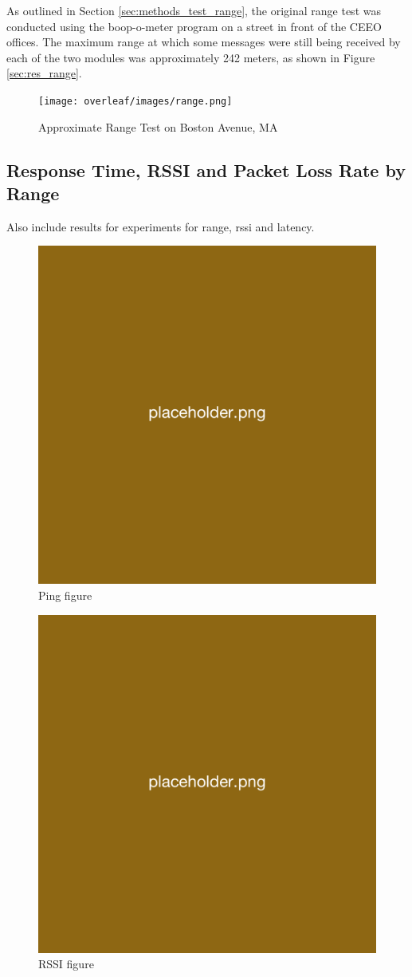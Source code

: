 As outlined in Section \ref{sec:methods_test_range}, the original range test was conducted using the boop-o-meter program on a street in front of the CEEO offices. The maximum range at which some messages were still being received by each of the two modules was approximately 242 meters, as shown in Figure \ref{sec:res_range}.

\begin{figure}[H]
    \centering
    \texttt{[image: overleaf/images/range.png]}
    \vspace{\ftspace}
    \caption{Approximate Range Test on Boston Avenue, MA}
    \label{fig:range}
\end{figure}


\subsection{\label{sec:res_rssi}Response Time, RSSI and Packet Loss Rate by Range}

Also include results for experiments for range, rssi and latency.

\begin{figure}[H]
    \centering
    \includegraphics[width=.5\linewidth]{overleaf/images/placeholder.png}
    \vspace{\ftspace}
    \caption{Ping figure}
    \label{fig:ping}
\end{figure}

\begin{figure}[H]
    \centering
    \includegraphics[width=.5\linewidth]{overleaf/images/placeholder.png}
    \vspace{\ftspace}
    \caption{RSSI figure}
    \label{fig:rssi}
\end{figure}

